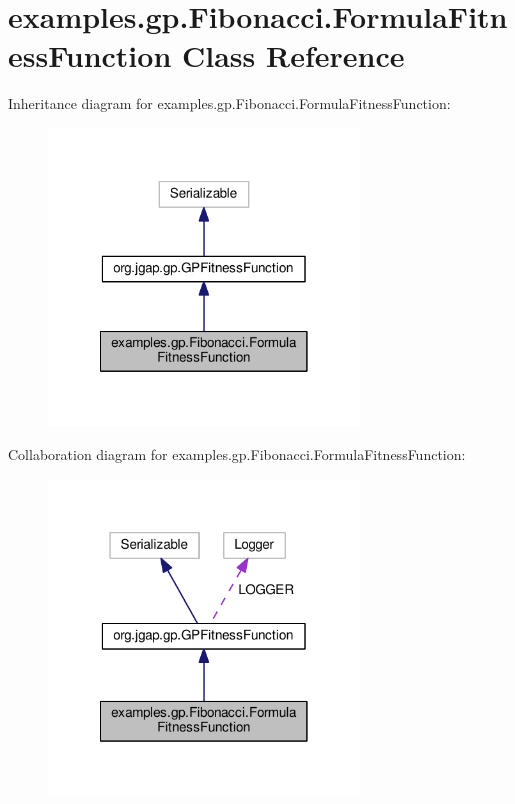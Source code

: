 \hypertarget{classexamples_1_1gp_1_1_fibonacci_1_1_formula_fitness_function}{\section{examples.\-gp.\-Fibonacci.\-Formula\-Fitness\-Function Class Reference}
\label{classexamples_1_1gp_1_1_fibonacci_1_1_formula_fitness_function}
}


Inheritance diagram for examples.\-gp.\-Fibonacci.\-Formula\-Fitness\-Function\-:
\nopagebreak
\begin{figure}[H]
\begin{center}
\leavevmode
\includegraphics[width=234pt]{classexamples_1_1gp_1_1_fibonacci_1_1_formula_fitness_function__inherit__graph}
\end{center}
\end{figure}


Collaboration diagram for examples.\-gp.\-Fibonacci.\-Formula\-Fitness\-Function\-:
\nopagebreak
\begin{figure}[H]
\begin{center}
\leavevmode
\includegraphics[width=234pt]{classexamples_1_1gp_1_1_fibonacci_1_1_formula_fitness_function__coll__graph}
\end{center}
\end{figure}

